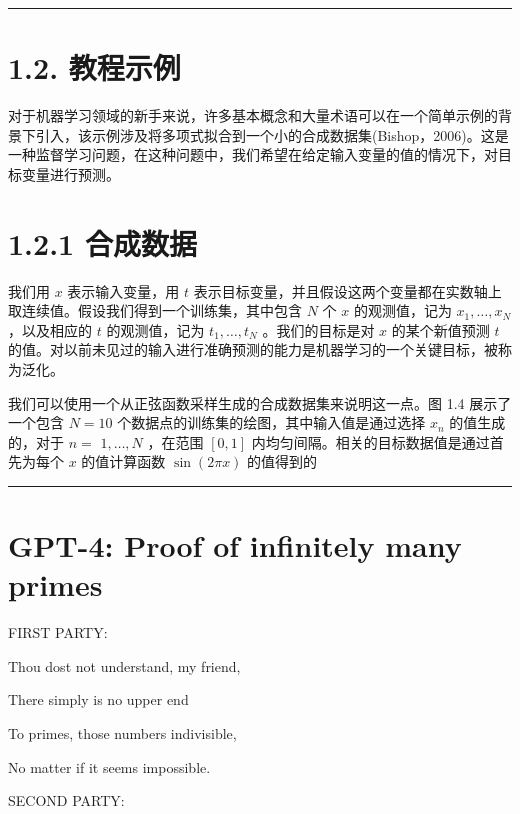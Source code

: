 \documentclass[10pt]{report}
\newcommand{\HRule}{\begin{center}\rule{0.9\linewidth}{0.2mm}\end{center}}
\begin{document}
\HRule

\section*{1.2. 教程示例}

对于机器学习领域的新手来说，许多基本概念和大量术语可以在一个简单示例的背景下引入，该示例涉及将多项式拟合到一个小的合成数据集(Bishop，2006)。这是一种监督学习问题，在这种问题中，我们希望在给定输入变量的值的情况下，对目标变量进行预测。

\section*{1.2.1 合成数据}

我们用 \(x\) 表示输入变量，用 \(t\) 表示目标变量，并且假设这两个变量都在实数轴上取连续值。假设我们得到一个训练集，其中包含 \(N\) 个 \(x\) 的观测值，记为 \({x}_{1},\ldots ,{x}_{N}\) ，以及相应的 \(t\) 的观测值，记为 \({t}_{1},\ldots ,{t}_{N}\) 。我们的目标是对 \(x\) 的某个新值预测 \(t\) 的值。对以前未见过的输入进行准确预测的能力是机器学习的一个关键目标，被称为泛化。

我们可以使用一个从正弦函数采样生成的合成数据集来说明这一点。图 1.4 展示了一个包含 \(N = {10}\) 个数据点的训练集的绘图，其中输入值是通过选择 \({x}_{n}\) 的值生成的，对于 \(n =\)  \(1,\ldots ,N\) ，在范围 \(\left\lbrack  {0,1}\right\rbrack\) 内均匀间隔。相关的目标数据值是通过首先为每个 \(x\) 的值计算函数 \(\sin \left( {2\pi x}\right)\) 的值得到的

\HRule

\section*{GPT-4: Proof of infinitely many primes}

\hspace*{1em} FIRST PARTY:

\hspace*{1em} Thou dost not understand, my friend,

\hspace*{1em} There simply is no upper end

\hspace*{1em} To primes, those numbers indivisible,

\hspace*{1em} No matter if it seems impossible.

\hspace*{1em} SECOND PARTY:
\end{document}
